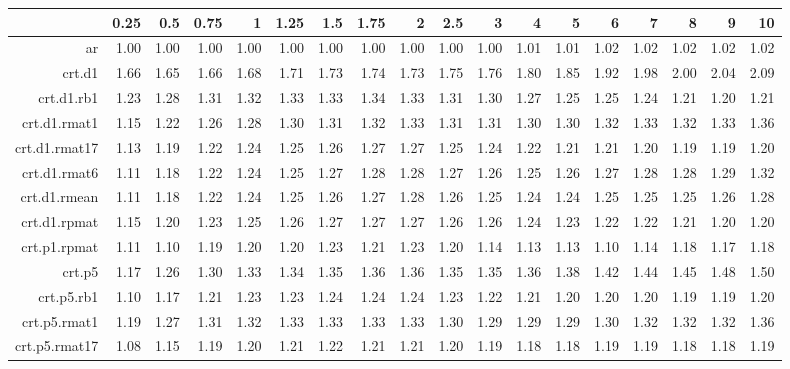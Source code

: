 \begin{tabular}{rrrrrrrrrrrrrrrrrr}
  \hline
 & 0.25 & 0.5 & 0.75 & 1 & 1.25 & 1.5 & 1.75 & 2 & 2.5 & 3 & 4 & 5 & 6 & 7 & 8 & 9 & 10 \\ 
  \hline
ar & 1.00 & 1.00 & 1.00 & 1.00 & 1.00 & 1.00 & 1.00 & 1.00 & 1.00 & 1.00 & 1.01 & 1.01 & 1.02 & 1.02 & 1.02 & 1.02 & 1.02 \\ 
  crt.d1 & 1.66 & 1.65 & 1.66 & 1.68 & 1.71 & 1.73 & 1.74 & 1.73 & 1.75 & 1.76 & 1.80 & 1.85 & 1.92 & 1.98 & 2.00 & 2.04 & 2.09 \\ 
  crt.d1.rb1 & 1.23 & 1.28 & 1.31 & 1.32 & 1.33 & 1.33 & 1.34 & 1.33 & 1.31 & 1.30 & 1.27 & 1.25 & 1.25 & 1.24 & 1.21 & 1.20 & 1.21 \\ 
  crt.d1.rmat1 & 1.15 & 1.22 & 1.26 & 1.28 & 1.30 & 1.31 & 1.32 & 1.33 & 1.31 & 1.31 & 1.30 & 1.30 & 1.32 & 1.33 & 1.32 & 1.33 & 1.36 \\ 
  crt.d1.rmat17 & 1.13 & 1.19 & 1.22 & 1.24 & 1.25 & 1.26 & 1.27 & 1.27 & 1.25 & 1.24 & 1.22 & 1.21 & 1.21 & 1.20 & 1.19 & 1.19 & 1.20 \\ 
  crt.d1.rmat6 & 1.11 & 1.18 & 1.22 & 1.24 & 1.25 & 1.27 & 1.28 & 1.28 & 1.27 & 1.26 & 1.25 & 1.26 & 1.27 & 1.28 & 1.28 & 1.29 & 1.32 \\ 
  crt.d1.rmean & 1.11 & 1.18 & 1.22 & 1.24 & 1.25 & 1.26 & 1.27 & 1.28 & 1.26 & 1.25 & 1.24 & 1.24 & 1.25 & 1.25 & 1.25 & 1.26 & 1.28 \\ 
  crt.d1.rpmat & 1.15 & 1.20 & 1.23 & 1.25 & 1.26 & 1.27 & 1.27 & 1.27 & 1.26 & 1.26 & 1.24 & 1.23 & 1.22 & 1.22 & 1.21 & 1.20 & 1.20 \\ 
  crt.p1.rpmat & 1.11 & 1.10 & 1.19 & 1.20 & 1.20 & 1.23 & 1.21 & 1.23 & 1.20 & 1.14 & 1.13 & 1.13 & 1.10 & 1.14 & 1.18 & 1.17 & 1.18 \\ 
  crt.p5 & 1.17 & 1.26 & 1.30 & 1.33 & 1.34 & 1.35 & 1.36 & 1.36 & 1.35 & 1.35 & 1.36 & 1.38 & 1.42 & 1.44 & 1.45 & 1.48 & 1.50 \\ 
  crt.p5.rb1 & 1.10 & 1.17 & 1.21 & 1.23 & 1.23 & 1.24 & 1.24 & 1.24 & 1.23 & 1.22 & 1.21 & 1.20 & 1.20 & 1.20 & 1.19 & 1.19 & 1.20 \\ 
  crt.p5.rmat1 & 1.19 & 1.27 & 1.31 & 1.32 & 1.33 & 1.33 & 1.33 & 1.33 & 1.30 & 1.29 & 1.29 & 1.29 & 1.30 & 1.32 & 1.32 & 1.32 & 1.36 \\ 
  crt.p5.rmat17 & 1.08 & 1.15 & 1.19 & 1.20 & 1.21 & 1.22 & 1.21 & 1.21 & 1.20 & 1.19 & 1.18 & 1.18 & 1.19 & 1.19 & 1.18 & 1.18 & 1.19 \\ 

\end{tabular}
